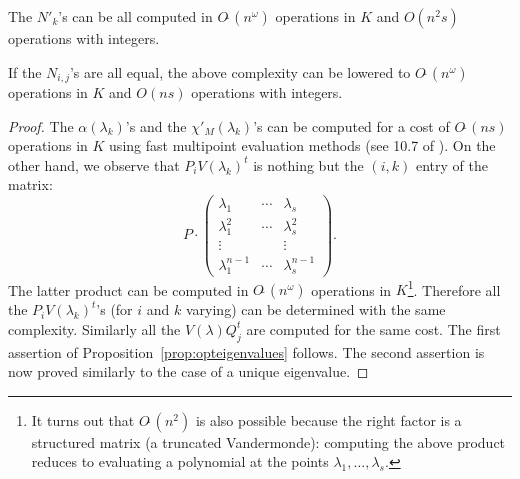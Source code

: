 \documentclass{sig-alternate-05-2015}
\newcommand{\softO}{O\tilde{~}}
\begin{document}
\begin{prop}
\label{prop:opteigenvalues}
The $N'_k$'s can be all computed in $\softO(n^\omega)$ operations
in $K$ and $O(n^2 s)$ operations with integers.

If the $N_{i,j}$'s are all equal, the above complexity can be 
lowered to $\softO(n^\omega)$ operations in $K$ and $O(n s)$ operations 
with integers.
\end{prop}

\begin{proof}
The $\alpha(\lambda_k)$'s and the $\chi'_M(\lambda_k)$'s can be computed 
for a cost of $\softO(ns)$ operations in $K$ using fast multipoint 
evaluation methods (see 10.7 of \cite{gathen-gerhard:13a}).
On the other hand, we observe that $P_i V(\lambda_k)^t$ is nothing but
the $(i,k)$ entry of the matrix:
$$P \cdot \left( \begin{matrix}
\lambda_1 & \cdots & \lambda_s \\
\lambda_1^2 & \cdots & \lambda_s^2 \\
\vdots & & \vdots \\
\lambda_1^{n-1} & \cdots & \lambda_s^{n-1}
\end{matrix} \right).$$
The latter product can be computed in $\softO(n^\omega)$ operations in 
$K$\footnote{It turns out that $\softO(n^2)$ is also possible because
the right factor is a structured matrix (a truncated Vandermonde):
computing the above product reduces to evaluating a polynomial at the
points $\lambda_1, \ldots, \lambda_s$.}. Therefore all the $P_i 
V(\lambda_k)^t$'s (for $i$ and $k$ varying) 
can be determined with the same complexity. 
Similarly all the $V(\lambda) Q_j^t$ are computed for the same cost.
The first assertion of Proposition~\ref{prop:opteigenvalues} follows.
The second assertion is now proved similarly to the case of a unique
eigenvalue.
\end{proof}




\end{document}
